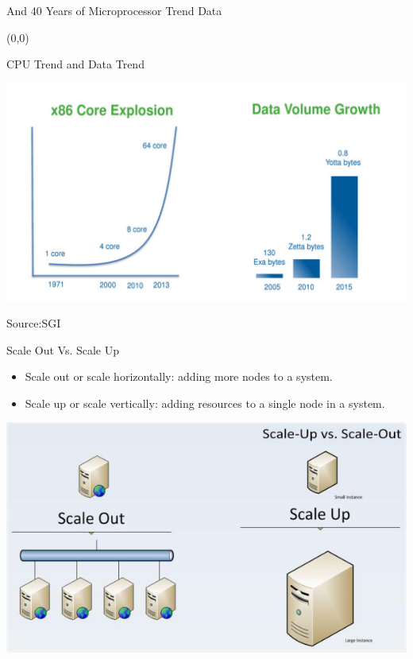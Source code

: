 \documentclass[english]{beamer} %
\begin{document}
\begin{frame}{And 40 Years of Microprocessor Trend Data}
\begin{textblock}{1}(0,0)
\end{textblock}
\end{frame}

\begin{frame}{CPU Trend and Data Trend}
\begin{center}
\includegraphics[scale=0.4]{fig/cpudata}
\end{center}
Source:SGI
\end{frame}

\begin{frame}{Scale Out Vs. Scale Up}
    \begin{itemize}
    \item Scale out or scale horizontally: adding more nodes to a system.
    \item Scale up or scale vertically: adding resources to a single node in a
    system.
    \end{itemize}
\begin{center}
\includegraphics[scale=0.5]{fig/scale}
\end{center}
\end{frame}
\end{document}
